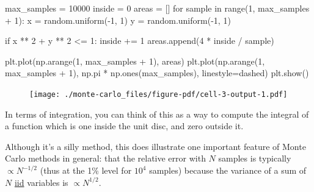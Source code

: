 \documentclass[
  letterpaper,
  DIV=11,
  numbers=noendperiod]{scrreprt}
\newenvironment{Shaded}{\begin{snugshade}}{\end{snugshade}}
\newcommand{\BuiltInTok}[1]{\textcolor[rgb]{0.00,0.23,0.31}{#1}}
\newcommand{\ControlFlowTok}[1]{\textcolor[rgb]{0.00,0.23,0.31}{#1}}
\newcommand{\DecValTok}[1]{\textcolor[rgb]{0.68,0.00,0.00}{#1}}
\newcommand{\KeywordTok}[1]{\textcolor[rgb]{0.00,0.23,0.31}{#1}}
\newcommand{\NormalTok}[1]{\textcolor[rgb]{0.00,0.23,0.31}{#1}}
\newcommand{\OperatorTok}[1]{\textcolor[rgb]{0.37,0.37,0.37}{#1}}
\newcommand{\StringTok}[1]{\textcolor[rgb]{0.13,0.47,0.30}{#1}}
\theoremstyle{definition}
\theoremstyle{remark}
\begin{document}
\begin{Shaded}
\begin{Highlighting}[]
\NormalTok{max\_samples }\OperatorTok{=} \DecValTok{10000}
\NormalTok{inside }\OperatorTok{=} \DecValTok{0}
\NormalTok{areas }\OperatorTok{=}\NormalTok{ []}
\ControlFlowTok{for}\NormalTok{ sample }\KeywordTok{in} \BuiltInTok{range}\NormalTok{(}\DecValTok{1}\NormalTok{, max\_samples }\OperatorTok{+} \DecValTok{1}\NormalTok{):}
\NormalTok{    x }\OperatorTok{=}\NormalTok{ random.uniform(}\OperatorTok{{-}}\DecValTok{1}\NormalTok{, }\DecValTok{1}\NormalTok{)}
\NormalTok{    y }\OperatorTok{=}\NormalTok{ random.uniform(}\OperatorTok{{-}}\DecValTok{1}\NormalTok{, }\DecValTok{1}\NormalTok{)}
    
    \ControlFlowTok{if}\NormalTok{ x }\OperatorTok{**} \DecValTok{2} \OperatorTok{+}\NormalTok{ y }\OperatorTok{**} \DecValTok{2} \OperatorTok{\textless{}=} \DecValTok{1}\NormalTok{:}
\NormalTok{        inside }\OperatorTok{+=} \DecValTok{1}
\NormalTok{    areas.append(}\DecValTok{4} \OperatorTok{*}\NormalTok{ inside }\OperatorTok{/}\NormalTok{ sample)}

\NormalTok{plt.plot(np.arange(}\DecValTok{1}\NormalTok{, max\_samples }\OperatorTok{+} \DecValTok{1}\NormalTok{), areas)}
\NormalTok{plt.plot(np.arange(}\DecValTok{1}\NormalTok{, max\_samples }\OperatorTok{+} \DecValTok{1}\NormalTok{), np.pi }\OperatorTok{*}\NormalTok{ np.ones(max\_samples), linestyle}\OperatorTok{=}\StringTok{\textquotesingle{}dashed\textquotesingle{}}\NormalTok{)}
\NormalTok{plt.show()}
\end{Highlighting}
\end{Shaded}

\begin{figure}[H]

{\centering \texttt{[image: ./monte-carlo\_files/figure-pdf/cell-3-output-1.pdf]}

}

\end{figure}

In terms of integration, you can think of this as a way to compute the
integral of a function which is one inside the unit disc, and zero
outside it.

Although it's a silly method, this does illustrate one important feature
of Monte Carlo methods in general: that the relative error with \(N\)
samples is typically \(\propto N^{-1/2}\) (thus at the 1\% level for
\(10^4\) samples) because the variance of a sum of \(N\)
\href{https://en.wikipedia.org/wiki/Independent_and_identically_distributed_random_variables}{iid}
variables is \(\propto N^{1/2}\).
\end{document}
